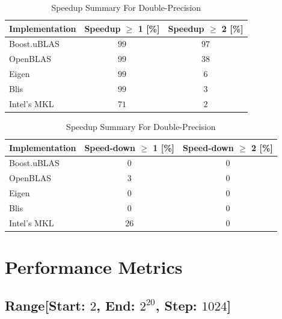 \begin{table}[ht]
    \centering
    \caption{Speedup Summary For Double-Precision}
    \begin{tabular}{|l|c|c|}
        \hline
        \textbf{Implementation} & \textbf{Speedup $\geq$ 1 [\%]} & \textbf{Speedup $\geq$ 2 [\%]}\\
        \hline
        Boost.uBLAS & $99$ & $97$ \\
        \hline
        OpenBLAS    & $99$ & $38$ \\
        \hline
        Eigen       & $99$ & $6$ \\
        \hline
        Blis        & $99$ & $3$ \\
        \hline
        Intel's MKL & $71$ & $2$ \\
        \hline
    \end{tabular}
    \newline
    \vspace*{1 cm}
    \newline
    \begin{tabular}{|l|c|c|}
        \hline
        \textbf{Implementation} & \textbf{Speed-down $\geq$ 1 [\%]} & \textbf{Speed-down $\geq$ 2 [\%]}\\
        \hline
        Boost.uBLAS & $0$ & $0$ \\
        \hline
        OpenBLAS    & $3$ & $0$ \\
        \hline
        Eigen       & $0$ & $0$ \\
        \hline
        Blis        & $0$ & $0$ \\
        \hline
        Intel's MKL & $26$ & $0$ \\
        \hline
    \end{tabular}
\end{table}

\newpage
\section{Performance Metrics}

\subsection*{Range[Start: $2$, End: $2^{20}$, Step: $1024$]}

